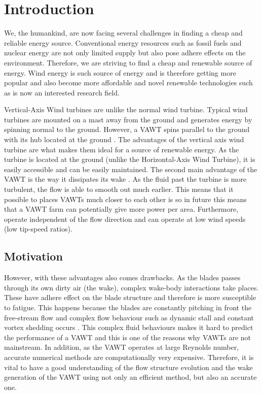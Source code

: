 \chapter{Introduction}
\label{ch:Introduction}

We, the humankind, are now facing several challenges in finding a cheap and reliable energy source. Conventional energy resources such as fossil fuels and nuclear energy are not only limited supply but also pose adhere effects on the environment. Therefore, we are striving to find a cheap and renewable source of energy. Wind energy is such source of energy and is therefore getting more popular and also become more affordable and novel renewable technologies such as  is now an interested research field.\\

Vertical-Axis Wind turbines are unlike the normal wind turbine. Typical wind turbines are mounted on a mast away from the ground and generates energy by spinning normal to the ground. However, a VAWT spins parallel to the ground with its hub located at the ground \cite{website:wikiVAWT}. The advantages of the vertical axis wind turbine are what makes them ideal for a source of renewable energy.  As the turbine is located at the ground (unlike the Horizontal-Axis Wind Turbine), it is easily accessible and can be easily maintained. The second main advantage of the VAWT is the way it dissipates its wake \cite{Ferreira} \cite{Vermeer2003}. As the fluid past the turbine is more turbulent, the flow is able to smooth out much earlier. This means that it possible to places VAWTs much closer to each other is so in future this means that a VAWT farm can potentially give more power per area. Furthermore, operate independent of the flow direction and can operate at low wind speeds (low tip-speed ratios).\\

\section{Motivation}
However, with these advantages also comes drawbacks. As the blades passes through its own dirty air (the wake), complex wake-body interactions take places. These have adhere effect on the blade structure and therefore is more susceptible to fatigue. This happens because the blades are constantly pitching in front the free-stream flow and complex flow behaviour such as dynamic stall and constant vortex shedding occurs \cite{SimaoFerreira2008}. This complex fluid behaviours makes it hard to predict the performance of a VAWT and this is one of the reasons why VAWTs are not mainstream. In addition, as the VAWT operates at large Reynolds number, accurate numerical methods are computationally very expensive. Therefore, it is vital to have a good understanding of the flow structure evolution and the wake generation of the VAWT using not only an efficient method, but also an accurate one.\\

